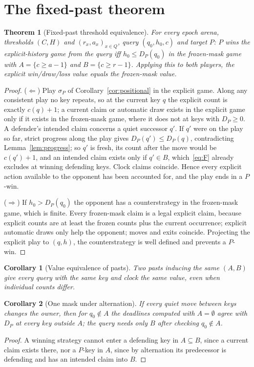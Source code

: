 \documentclass[journal]{IEEEtran}
\newtheorem{theorem}{Theorem}
\newtheorem{corollary}{Corollary}
\theoremstyle{definition}
\theoremstyle{remark}
\begin{document}
\section{The fixed-past theorem}\label{sec:main}

\begin{theorem}[Fixed-past threshold equivalence]\label{thm:main}
For every epoch arena, thresholds $(C,H)$ and $(r_x,a_x)_{x\in Q}$, query $(q_0,h_0,c)$ and target $P$: $P$ wins the explicit-history game from the query iff $h_0\le D_P(q_0)$ in the frozen-mask game with $A=\{c\ge a-1\}$ and $B=\{c\ge r-1\}$. Applying this to both players, the explicit win/draw/loss value equals the frozen-mask value.
\end{theorem}
\begin{proof}
($\Leftarrow$) Play $\sigma_P$ of Corollary~\ref{cor:positional} in the explicit game. Along any consistent play no key repeats, so at the current key $q$ the explicit count is exactly $c(q)+1$; a current claim or automatic draw exists in the explicit game only if it exists in the frozen-mask game, where it does not at keys with $D_P\ge0$. A defender's intended claim concerns a quiet successor $q'$. If $q'$ were on the play so far, strict progress along the play gives $D_P(q')\le D_P(q)$, contradicting Lemma~\ref{lem:progress}; so $q'$ is fresh, its count after the move would be $c(q')+1$, and an intended claim exists only if $q'\in B$, which~\eqref{eq:F} already excludes at winning defending keys. Clock claims coincide. Hence every explicit action available to the opponent has been accounted for, and the play ends in a $P$-win.

($\Rightarrow$) If $h_0>D_P(q_0)$ the opponent has a counterstrategy in the frozen-mask game, which is finite. Every frozen-mask claim is a legal explicit claim, because explicit counts are at least the frozen counts plus the current occurrence; explicit automatic draws only help the opponent; moves and exits coincide. Projecting the explicit play to $(q,h)$, the counterstrategy is well defined and prevents a $P$-win.
\end{proof}

\begin{corollary}[Value equivalence of pasts]
Two pasts inducing the same $(A,B)$ give every query with the same key and clock the same value, even when individual counts differ.
\end{corollary}

\begin{corollary}[One mask under alternation]\label{cor:onemask}
If every quiet move between keys changes the owner, then for $q_0\notin A$ the deadlines computed with $A=\emptyset$ agree with $D_P$ at every key outside $A$; the query needs only $B$ after checking $q_0\notin A$.
\end{corollary}
\begin{proof}
A winning strategy cannot enter a defending key in $A\subseteq B$, since a current claim exists there, nor a $P$-key in $A$, since by alternation its predecessor is defending and has an intended claim into $B$.
\end{proof}
\end{document}
